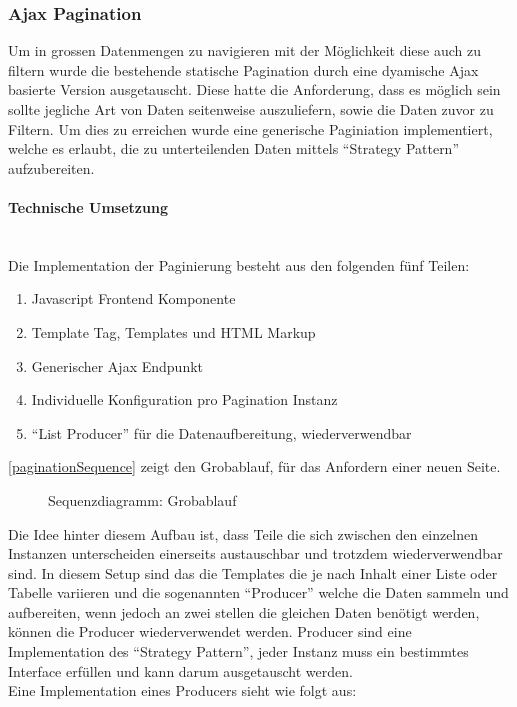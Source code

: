 \subsubsection{Ajax Pagination}
Um in grossen Datenmengen zu navigieren mit der Möglichkeit diese auch zu
filtern wurde die bestehende statische Pagination durch eine dyamische Ajax
basierte Version ausgetauscht. Diese hatte die Anforderung, dass es möglich sein
sollte jegliche Art von Daten seitenweise auszuliefern, sowie die Daten zuvor zu
Filtern. Um dies zu erreichen wurde eine generische Paginiation implementiert,
welche es erlaubt, die zu unterteilenden Daten mittels \enquote{Strategy
Pattern}\cite{gamma1994design} aufzubereiten.

\paragraph{Technische Umsetzung} \hspace{0pt} \\
Die Implementation der Paginierung besteht aus den folgenden fünf Teilen:
\begin{enumerate}
	\item Javascript Frontend Komponente
	\item Template Tag, Templates und HTML Markup
	\item Generischer Ajax Endpunkt
	\item Individuelle Konfiguration pro Pagination Instanz
	\item \enquote{List Producer} für die Datenaufbereitung, wiederverwendbar
\end{enumerate}

\autoref{paginationSequence} zeigt den Grobablauf, für das Anfordern einer
neuen Seite.

\begin{figure}[H]
	\centering
	
	\label{paginationSequence}
	\caption{Sequenzdiagramm: Grobablauf}
\end{figure}

Die Idee hinter diesem Aufbau ist, dass Teile die sich zwischen den einzelnen
Instanzen unterscheiden einerseits austauschbar und trotzdem wiederverwendbar
sind. In diesem Setup sind das die Templates die je nach Inhalt einer Liste oder
Tabelle variieren und die sogenannten \enquote{Producer} welche die Daten
sammeln und aufbereiten, wenn jedoch an zwei stellen die gleichen Daten benötigt
werden, können die Producer wiederverwendet werden.
Producer sind eine Implementation des \enquote{Strategy Pattern}, jeder Instanz
muss ein bestimmtes Interface erfüllen und kann darum ausgetauscht werden.\\
Eine Implementation eines Producers sieht wie folgt aus:

